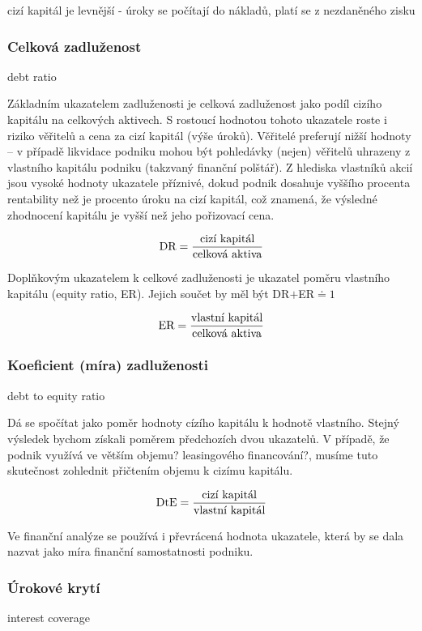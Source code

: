 cizí kapitál je levnější - úroky se počítají do nákladů, platí se z nezdaněného zisku

\subsubsection{Celková zadluženost}
debt ratio

Základním ukazatelem zadluženosti je celková zadluženost jako podíl cizího kapitálu na celkových aktivech. S rostoucí hodnotou tohoto ukazatele roste i riziko věřitelů a cena za cizí kapitál (výše úroků). Věřitelé preferují nižší hodnoty -- v případě likvidace podniku mohou být pohledávky (nejen) věřitelů uhrazeny z vlastního kapitálu podniku (takzvaný finanční polštář).
Z hlediska vlastníků akcií jsou vysoké hodnoty ukazatele příznivé, dokud podnik dosahuje vyššího procenta rentability než je procento úroku na cizí kapitál, což znamená, že výsledné zhodnocení kapitálu je vyšší než jeho pořizovací cena\cite{such}. 

$$\text{DR} = \dfrac{\text{cizí kapitál}}{\text{celková aktiva}}$$

\vspace{3mm}
Doplňkovým ukazatelem k celkové zadluženosti je ukazatel poměru vlastního kapitálu (equity ratio, ER). Jejich součet by měl být DR$+$ER$
\doteq 1$

$$\text{ER} = \dfrac{\text{vlastní kapitál}}{\text{celková aktiva}}$$

\subsubsection{Koeficient (míra) zadluženosti}
debt to equity ratio

Dá se spočítat jako poměr hodnoty cízího kapitálu k hodnotě vlastního. Stejný výsledek bychom získali poměrem předchozích dvou ukazatelů. V případě, že podnik využívá ve větším objemu? leasingového financování?, musíme tuto skutečnost zohlednit přičtením objemu k cizímu kapitálu. 

$$\text{DtE} = \dfrac{\text{cizí kapitál}}{\text{vlastní kapitál}}$$

\vspace{3mm}
Ve finanční analýze se používá i převrácená hodnota ukazatele, která by se dala nazvat jako míra finanční samostatnosti podniku.

\subsubsection{Úrokové krytí}
interest coverage

